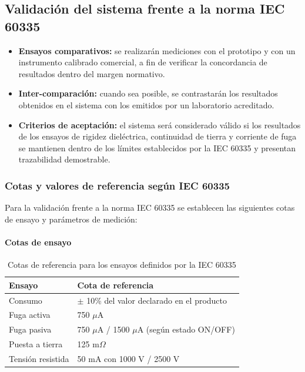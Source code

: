 \documentclass[a4paper,12pt]{article}
\begin{document}
\subsection{Validación del sistema frente a la norma IEC 60335}
\begin{itemize}
    \item \textbf{Ensayos comparativos:} se realizarán mediciones con el prototipo y con un instrumento calibrado comercial, a fin de verificar la concordancia de resultados dentro del margen normativo.
    \item \textbf{Inter-comparación:} cuando sea posible, se contrastarán los resultados obtenidos en el sistema con los emitidos por un laboratorio acreditado.
    \item \textbf{Criterios de aceptación:} el sistema será considerado válido si los resultados de los ensayos de rigidez dieléctrica, continuidad de tierra y corriente de fuga se mantienen dentro de los límites establecidos por la IEC 60335 y presentan trazabilidad demostrable.
\end{itemize}

\subsubsection{Cotas y valores de referencia según IEC 60335}

Para la validación frente a la norma IEC 60335 se establecen las siguientes cotas de ensayo y parámetros de medición:

\paragraph{Cotas de ensayo}
\begin{table}[H]
\centering
\begin{tabular}{|l|l|}
\hline
\textbf{Ensayo} & \textbf{Cota de referencia} \\ \hline
Consumo & $\pm$ 10\% del valor declarado en el producto \\ \hline
Fuga activa & 750 $\mu$A \\ \hline
Fuga pasiva & 750 $\mu$A / 1500 $\mu$A (según estado ON/OFF) \\ \hline
Puesta a tierra & 125 m$\Omega$ \\ \hline
Tensión resistida & 50 mA con 1000 V / 2500 V \\ \hline
\end{tabular}
\caption{Cotas de referencia para los ensayos definidos por la IEC 60335}
\end{table}
\end{document}
